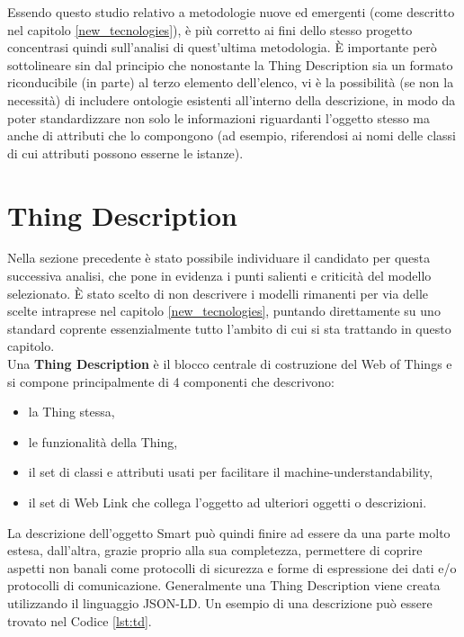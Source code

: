 \documentclass[12pt,a4paper,openright,oneside]{report}
\begin{document}
Essendo questo studio relativo a metodologie nuove ed emergenti (come descritto nel capitolo \ref{new_tecnologies}), è più corretto ai fini dello stesso progetto concentrasi quindi sull'analisi di quest'ultima metodologia. È importante però sottolineare sin dal principio che nonostante la Thing Description sia un formato riconducibile (in parte) al terzo elemento dell'elenco, vi è la possibilità (se non la necessità) di includere ontologie esistenti all'interno della descrizione, in modo da poter standardizzare non solo le informazioni riguardanti l'oggetto stesso ma anche di attributi che lo compongono (ad esempio, riferendosi ai nomi delle classi di cui attributi possono esserne le istanze).\\

\section{Thing Description}
\label{sec:thing_description}
Nella sezione precedente è stato possibile individuare il candidato per questa successiva analisi, che pone in evidenza i punti salienti e criticità del modello selezionato. È stato scelto di non descrivere i modelli rimanenti per via delle scelte intraprese nel capitolo \ref{new_tecnologies}, puntando direttamente su uno standard coprente essenzialmente tutto l'ambito di cui si sta trattando in questo capitolo.\\

Una \textbf{Thing Description} \cite{td} è il blocco centrale di costruzione del Web of Things e si compone principalmente di 4 componenti che descrivono: 
\begin{itemize}
	\setlength\itemsep{-0.7em}
	\item la Thing stessa,
	\item le funzionalità della Thing,
	\item il set di classi e attributi usati per facilitare il machine-understandability,
	\item il set di Web Link che collega l'oggetto ad ulteriori oggetti o descrizioni.
\end{itemize}

La descrizione dell'oggetto Smart può quindi finire ad essere da una parte molto estesa, dall'altra, grazie proprio alla sua completezza, permettere di coprire aspetti non banali come protocolli di sicurezza e forme di espressione dei dati e/o protocolli di comunicazione.
Generalmente una Thing Description viene creata utilizzando il linguaggio JSON-LD. Un esempio di una descrizione può essere trovato nel Codice \ref{lst:td}.
\end{document}
